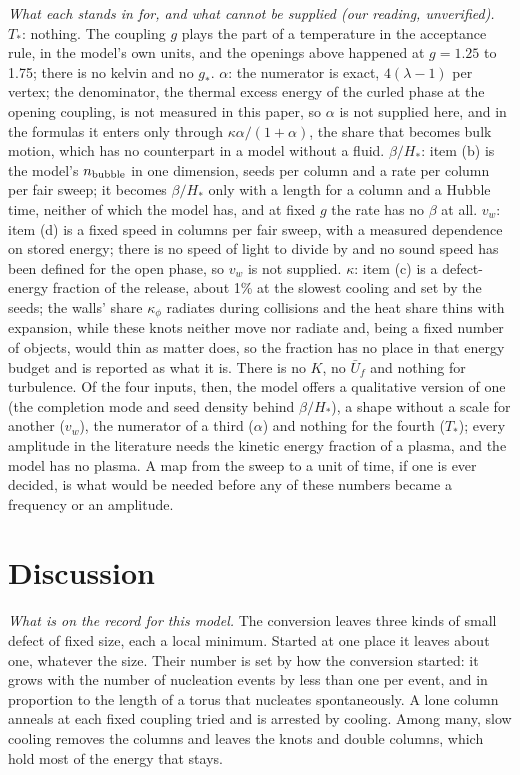 \documentclass[aps,pre,10pt,twocolumn,superscriptaddress,nofootinbib]{revtex4-2}
\begin{document}
\emph{What each stands in for, and what cannot be supplied (our reading, unverified).} $T_*$: nothing. The coupling
$g$ plays the part of a temperature in the acceptance rule, in the model's own units, and the openings above
happened at $g = 1.25$ to 1.75; there is no kelvin and no $g_*$. $\alpha$: the numerator is exact, $4(\lambda - 1)$
per vertex; the denominator, the thermal excess energy of the curled phase at the opening coupling, is not measured
in this paper, so $\alpha$ is not supplied here, and in the formulas it enters only through $\kappa\alpha/(1 +
\alpha)$, the share that becomes bulk motion, which has no counterpart in a model without a fluid. $\beta/H_*$: item
(b) is the model's $n_{\rm bubble}$ in one dimension, seeds per column and a rate per column per fair sweep; it
becomes $\beta/H_*$ only with a length for a column and a Hubble time, neither of which the model has, and at fixed
$g$ the rate has no $\beta$ at all. $v_w$: item (d) is a fixed speed in columns per fair sweep, with a measured
dependence on stored energy; there is no speed of light to divide by and no sound speed has been defined for the
open phase, so $v_w$ is not supplied. $\kappa$: item (c) is a defect-energy fraction of the release, about 1\% at
the slowest cooling and set by the seeds; the walls' share $\kappa_\phi$ radiates during collisions and the heat
share thins with expansion, while these knots neither move nor radiate and, being a fixed number of objects, would
thin as matter does, so the fraction has no place in that energy budget and is reported as what it is. There is no
$K$, no $\bar U_f$ and nothing for turbulence. Of the four inputs, then, the model offers a qualitative version of
one (the completion mode and seed density behind $\beta/H_*$), a shape without a scale for another ($v_w$), the
numerator of a third ($\alpha$) and nothing for the fourth ($T_*$); every amplitude in the literature needs the
kinetic energy fraction of a plasma, and the model has no plasma. A map from the sweep to a unit of time, if one is
ever decided, is what would be needed before any of these numbers became a frequency or an amplitude.

\section{Discussion}
\label{sec:discussion}

\emph{What is on the record for this model.} The conversion leaves three kinds of small defect of fixed size,
each a local minimum. Started at one place it leaves about one, whatever the size. Their number is set by how
the conversion started: it grows with the number of nucleation events by less than one per event, and in
proportion to the length of a torus that nucleates spontaneously. A lone column anneals at each fixed coupling
tried and is arrested by cooling. Among many, slow cooling removes the columns and leaves the knots and double
columns, which hold most of the energy that stays.
\end{document}

